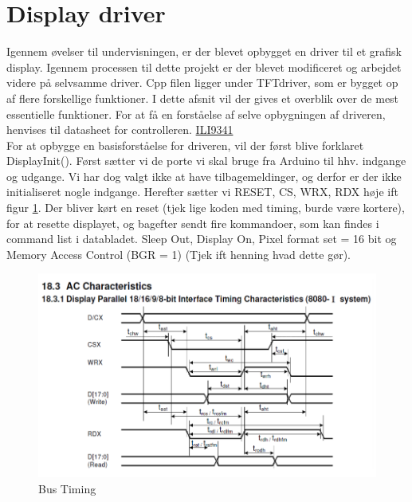 \graphicspath{{Chapters/Display/}}


\section{Display driver}
Igennem øvelser til undervisningen, er der blevet opbygget en driver til et grafisk display. Igennem processen til dette projekt er der blevet modificeret og arbejdet videre på selvsamme driver. Cpp filen ligger under TFTdriver, som er bygget op af flere forskellige funktioner. I dette afsnit vil der gives et overblik over de mest essentielle funktioner. For at få en forståelse af selve opbygningen af driveren, henvises til datasheet for controlleren. 
\href{https://blackboard.au.dk/bbcswebdav/pid-1697983-dt-content-rid-3847230_1/courses/BB-Cou-UUVA-73302/BB-Cou-UUVA-65758_ImportedContent_20170106021228/BB-Cou-STADS-UUVA-52360_ImportedContent_20160107025559/LAB/Lab3a%20Graphic%20LCD%20Display/Files%20for%20LAB3a/ILI9341_v1.11.pdf}{ILI9341} \\
For at opbygge en basisforståelse for driveren, vil der først blive forklaret DisplayInit(). Først sætter vi de porte vi skal bruge fra Arduino til hhv. indgange og udgange. Vi har dog valgt ikke at have tilbagemeldinger, og derfor er der ikke initialiseret nogle indgange. Herefter sætter vi RESET, CS, WRX, RDX høje ift figur \ref{fig:Bus_timing}. Der bliver kørt en reset (tjek lige koden med timing, burde være kortere), for at resette displayet, og bagefter sendt fire kommandoer, som kan findes i command list i databladet. Sleep Out, Display On, Pixel format set = 16 bit og Memory Access Control (BGR = 1) (Tjek ift henning hvad dette gør). 



\begin{figure}[H]
	\centering
	\includegraphics[width = 400 pt]{Img/Bus_timing.png}
	\caption{Bus Timing}
	\label{fig:Bus_timing}
\end{figure}

